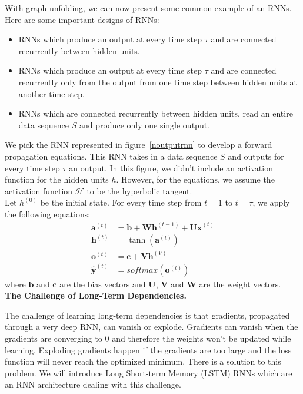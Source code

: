 With graph unfolding, we can now present some common example of an RNNs. Here are
some important designs of RNNs:
\begin{itemize}
  \item RNNs which produce an output at every time step $\tau$ and are connected
    recurrently between hidden units.
  \item RNNs which produce an output at every time step $\tau$ and are connected
    recurrently only from the output from one time step between hidden units at
    another time step.
  \item RNNs which are connected recurrently between hidden units, read an
    entire data sequence $S$ and produce only one single output.
\end{itemize}



We pick the RNN represented in figure~\ref{noutputrnn} to develop a forward
propagation equations. This RNN takes in a data sequence $S$ and outputs for
every time step $\tau$ an output. In this figure, we didn't include an
activation function for the hidden units $h$. However, for the equations, we
assume the activation function $\mathcal{H}$ to be the hyperbolic tangent.\\

Let $h^{(0)}$ be the initial state. For every time step from $t = 1$ to $t =
\tau$, we apply the following equations:
  \begin{align}
    \bm{a}^{(t)} & = \bm{b} + \bm{Wh}^{(t-1)} + \bm{Ux}^{(t)} \\
    \bm{h}^{(t)} & = \tanh(\bm{a}^{(t)}) \\
    \bm{o}^{(t)} & = \bm c + \bm{Vh}^{(V)} \\
    \bm{\hat y}^{(t)} & = softmax(\bm o^{(t)})
  \end{align}
where $\bm b$ and $\bm c$ are the bias vectors and $\bm U$, $\bm V$ and $\bm W$ are
the weight vectors.\\


\textbf{The Challenge of Long-Term Dependencies.} 

The challenge of learning long-term dependencies is that gradients, propagated
through a very deep RNN, can vanish or explode. Gradients can vanish when the
gradients are converging to $0$ and therefore the weights won't be updated while
learning. Exploding gradients happen if the gradients are too large and the loss
function will never reach the optimized minimum. There is a solution to this
problem. We will introduce Long Short-term Memory (LSTM) RNNs which are an RNN
architecture dealing with this challenge.\cite{doi:10.1162/neco.1997.9.8.1735}
